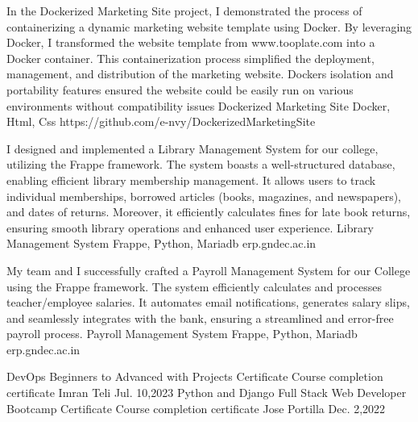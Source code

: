 \documentclass[]{awesome-cv}
\begin{document}
\begin{cventries}
	\vspace{-5mm}
	\cventry
	{In the Dockerized Marketing Site project, I demonstrated the process of containerizing a dynamic marketing website template using Docker. By leveraging Docker, I transformed the website template from www.tooplate.com into a Docker container. This containerization process simplified the deployment, management, and distribution of the marketing website. Docker\textquotesingle{}s isolation and portability features ensured the website could be easily run on various environments without compatibility issues}
	{Dockerized Marketing Site}
	{Docker, Html, Css}
	{https://github.com/e-nvy/DockerizedMarketingSite}
	{}
	
	\vspace{-5mm}
	\cventry
	{I designed and implemented a Library Management System for our college, utilizing the Frappe framework. The system boasts a well-structured database, enabling efficient library membership management. It allows users to track individual memberships, borrowed articles (books, magazines, and newspapers), and dates of returns. Moreover, it efficiently calculates fines for late book returns, ensuring smooth library operations and enhanced user experience.}
	{Library Management System}
	{Frappe, Python, Mariadb}
	{erp.gndec.ac.in}
	{}
	
	\vspace{-5mm}
	\cventry
	{My team and I successfully crafted a Payroll Management System for our College using the Frappe framework. The system efficiently calculates and processes teacher/employee salaries. It automates email notifications, generates salary slips, and seamlessly integrates with the bank, ensuring a streamlined and error-free payroll process.}
	{Payroll Management System}
	{Frappe, Python, Mariadb}
	{erp.gndec.ac.in}
	{}
	
	\vspace{-5mm}
\end{cventries}
\begin{cvhonors}
	\cvhonor
	{DevOps Beginners to Advanced with Projects Certificate}
	{Course completion certificate}
	{Imran Teli}
	{Jul. 10,2023}
	\cvhonor
	{Python and Django Full Stack Web Developer Bootcamp Certificate}
	{Course completion certificate}
	{Jose Portilla}
	{Dec. 2,2022}
\end{cvhonors}
\ 
\end{document}
